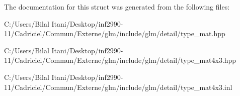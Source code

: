 The documentation for this struct was generated from the following files\+:\begin{DoxyCompactItemize}
\item 
C\+:/\+Users/\+Bilal Itani/\+Desktop/inf2990-\/11/\+Cadriciel/\+Commun/\+Externe/glm/include/glm/detail/type\+\_\+mat.\+hpp\item 
C\+:/\+Users/\+Bilal Itani/\+Desktop/inf2990-\/11/\+Cadriciel/\+Commun/\+Externe/glm/include/glm/detail/type\+\_\+mat4x3.\+hpp\item 
C\+:/\+Users/\+Bilal Itani/\+Desktop/inf2990-\/11/\+Cadriciel/\+Commun/\+Externe/glm/include/glm/detail/type\+\_\+mat4x3.\+inl\end{DoxyCompactItemize}

